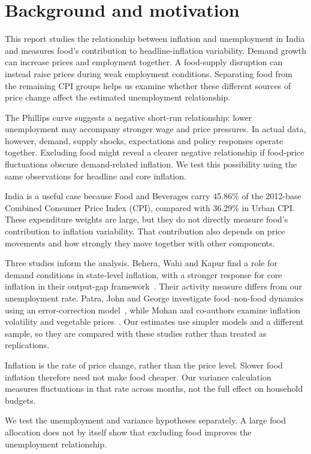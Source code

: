 \documentclass[10pt,a4paper]{article}
\begin{document}
\section{Background and motivation}

This report studies the relationship between inflation and unemployment in India and measures food's contribution to headline-inflation variability. Demand growth can increase prices and employment together. A food-supply disruption can instead raise prices during weak employment conditions. Separating food from the remaining CPI groups helps us examine whether these different sources of price change affect the estimated unemployment relationship.

The Phillips curve suggests a negative short-run relationship: lower unemployment may accompany stronger wage and price pressures. In actual data, however, demand, supply shocks, expectations and policy responses operate together. Excluding food might reveal a clearer negative relationship if food-price fluctuations obscure demand-related inflation. We test this possibility using the same observations for headline and core inflation.

India is a useful case because Food and Beverages carry 45.86\% of the 2012-base Combined Consumer Price Index (CPI), compared with 36.29\% in Urban CPI. These expenditure weights are large, but they do not directly measure food's contribution to inflation variability. That contribution also depends on price movements and how strongly they move together with other components.

Three studies inform the analysis. Behera, Wahi and Kapur find a role for demand conditions in state-level inflation, with a stronger response for core inflation in their output-gap framework~\cite{behera2017}. Their activity measure differs from our unemployment rate. Patra, John and George investigate food--non-food dynamics using an error-correction model~\cite{patra2024}, while Mohan and co-authors examine inflation volatility and vegetable prices~\cite{mohan2026}. Our estimates use simpler models and a different sample, so they are compared with these studies rather than treated as replications.

Inflation is the rate of price change, rather than the price level. Slower food inflation therefore need not make food cheaper. Our variance calculation measures fluctuations in that rate across months, not the full effect on household budgets.

We test the unemployment and variance hypotheses separately. A large food allocation does not by itself show that excluding food improves the unemployment relationship.
\end{document}

